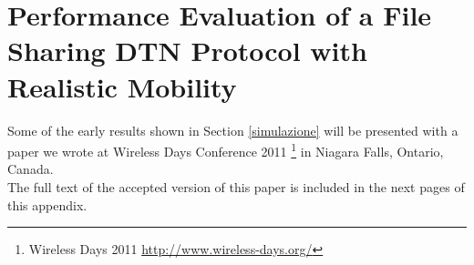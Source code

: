 \chapter{Performance Evaluation of a File Sharing DTN Protocol with Realistic Mobility}\label{appendice-paper}

Some of the early results shown in Section \ref{simulazione} will be presented with a paper we wrote at Wireless Days Conference 2011 \footnote{Wireless Days 2011 \href{http://www.wireless-days.org/}{http://www.wireless-days.org/}} in Niagara Falls, Ontario, Canada. 
\\

The full text of the accepted version of this paper is included in the next pages of this appendix.

\cleardoublepage

